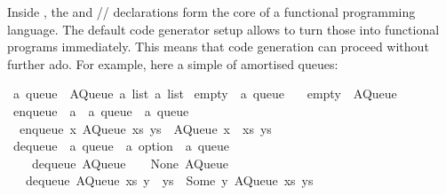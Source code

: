 \begin{isabellebody}
\begin{isamarkuptext}
  Inside \hyperlink{theory.HOL}{\mbox{}}, the \hyperlink{command.datatype}{\mbox{}} and
  \hyperlink{command.definition}{\mbox{}}/\hyperlink{command.primrec}{\mbox{}}/\hyperlink{command.fun}{\mbox{}} declarations form
  the core of a functional programming language.  The default code generator setup
  allows to turn those into functional programs immediately.
  This means that  code generation can proceed without further ado.
  For example, here a simple  of amortised queues:%
\end{isamarkuptext}%
\isamarkuptrue%
%
\isadelimquote
%
\endisadelimquote
%
\isatagquote
{}\isamarkupfalse%
\ {\isacharprime}a\ queue\ {\isacharequal}\ AQueue\ {\isachardoublequoteopen}{\isacharprime}a\ list{\isachardoublequoteclose}\ {\isachardoublequoteopen}{\isacharprime}a\ list{\isachardoublequoteclose}\isanewline
\isanewline
{}\isamarkupfalse%
\ empty\ {\isacharcolon}{\isacharcolon}\ {\isachardoublequoteopen}{\isacharprime}a\ queue{\isachardoublequoteclose}\ \isanewline
\ \ {\isachardoublequoteopen}empty\ {\isacharequal}\ AQueue\ {\isacharbrackleft}{\isacharbrackright}\ {\isacharbrackleft}{\isacharbrackright}{\isachardoublequoteclose}\isanewline
\isanewline
{}\isamarkupfalse%
\ enqueue\ {\isacharcolon}{\isacharcolon}\ {\isachardoublequoteopen}{\isacharprime}a\ {\isasymRightarrow}\ {\isacharprime}a\ queue\ {\isasymRightarrow}\ {\isacharprime}a\ queue{\isachardoublequoteclose}\ \isanewline
\ \ {\isachardoublequoteopen}enqueue\ x\ {\isacharparenleft}AQueue\ xs\ ys{\isacharparenright}\ {\isacharequal}\ AQueue\ {\isacharparenleft}x\ {\isacharhash}\ xs{\isacharparenright}\ ys{\isachardoublequoteclose}\isanewline
\isanewline
{}\isamarkupfalse%
\ dequeue\ {\isacharcolon}{\isacharcolon}\ {\isachardoublequoteopen}{\isacharprime}a\ queue\ {\isasymRightarrow}\ {\isacharprime}a\ option\ {\isasymtimes}\ {\isacharprime}a\ queue{\isachardoublequoteclose}\ \isanewline
\ \ \ \ {\isachardoublequoteopen}dequeue\ {\isacharparenleft}AQueue\ {\isacharbrackleft}{\isacharbrackright}\ {\isacharbrackleft}{\isacharbrackright}{\isacharparenright}\ {\isacharequal}\ {\isacharparenleft}None{\isacharcomma}\ AQueue\ {\isacharbrackleft}{\isacharbrackright}\ {\isacharbrackleft}{\isacharbrackright}{\isacharparenright}{\isachardoublequoteclose}\isanewline
\ \ {\isacharbar}\ {\isachardoublequoteopen}dequeue\ {\isacharparenleft}AQueue\ xs\ {\isacharparenleft}y\ {\isacharhash}\ ys{\isacharparenright}{\isacharparenright}\ {\isacharequal}\ {\isacharparenleft}Some\ y{\isacharcomma}\ AQueue\ xs\ ys{\isacharparenright}{\isachardoublequoteclose}\isanewline

\end{isabellebody}
